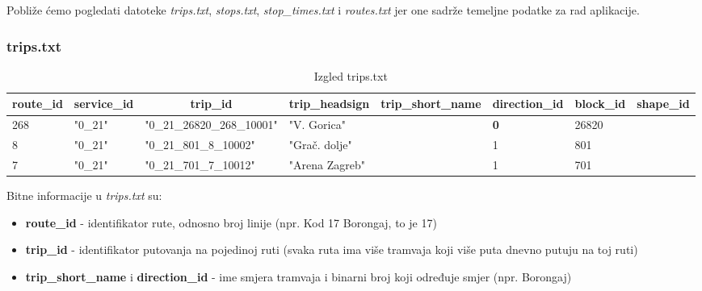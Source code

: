 \documentclass[zavrsnirad]{fer}
\begin{document}
Pobliže ćemo pogledati datoteke \textit{trips.txt}, \textit{stops.txt}, \textit{stop\_times.txt} i \textit{routes.txt} jer one sadrže temeljne podatke za rad aplikacije.

\subsubsection{trips.txt}

\begin{table}[htb]
	\begin{adjustbox}{width=\columnwidth,center}
	\begin{tabular}{l|l|l|l|l|l|l|l}
		\hline
		\multicolumn{1}{c|}{\textbf{route\_id}} & \multicolumn{1}{c|}{\textbf{service\_id}} & \multicolumn{1}{c|}{\textbf{trip\_id}} & \multicolumn{1}{c|}{\textbf{trip\_headsign}} & \multicolumn{1}{c|}{\textbf{trip\_short\_name}} & \multicolumn{1}{c|}{\textbf{direction\_id}} & \multicolumn{1}{c|}{\textbf{block\_id}} & \multicolumn{1}{c}{\textbf{shape\_id}} \\ \hline
		268 & "0\_21" & "0\_21\_26820\_268\_10001" & "V. Gorica" &  & \textbf{0} & 26820 &  \\ \hline
		8 & "0\_21" & "0\_21\_801\_8\_10002" & "Grač. dolje" & \textbf{} & 1 & 801 &  \\ \hline
		7 & "0\_21" & "0\_21\_701\_7\_10012" & "Arena Zagreb" & \textbf{} & 1 & 701 &  \\ \hline
	\end{tabular}
	\end{adjustbox}
	\caption{Izgled trips.txt}
	\label{tbl:trips}
\end{table}


Bitne informacije u \textit{trips.txt} su:
\begin{itemize}
	\item \textbf{route\_id} - identifikator rute, odnosno broj linije (npr. Kod 17 Borongaj, to je 17)
	\item \textbf{trip\_id} - identifikator putovanja na pojedinoj ruti (svaka ruta ima više tramvaja koji više puta dnevno putuju na toj ruti)
	\item \textbf{trip\_short\_name} i \textbf{direction\_id} - ime smjera tramvaja i binarni broj koji određuje smjer (npr. Borongaj)
\end{itemize}
\end{document}
